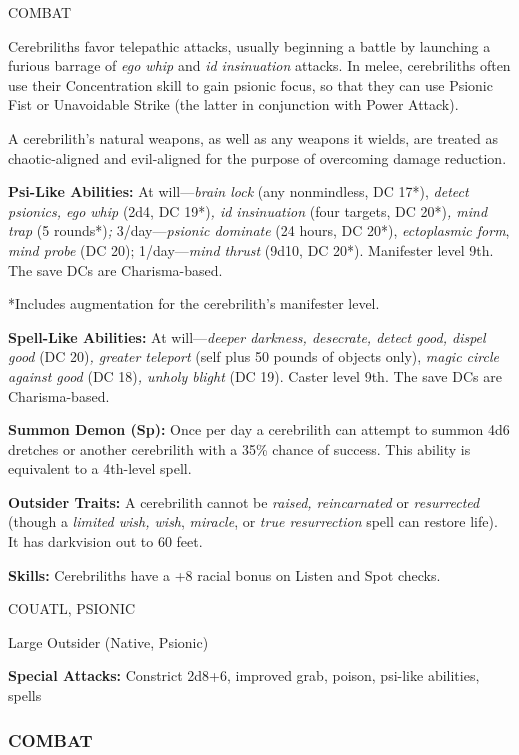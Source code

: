 \documentclass{article}
\begin{document}
COMBAT

Cerebriliths favor telepathic attacks, usually beginning a battle by launching 
a furious barrage of \textit{ego whip }and \textit{id insinuation }attacks. In 
melee, cerebriliths often use their Concentration skill to gain psionic focus, 
so that they can use Psionic Fist or Unavoidable Strike (the latter in conjunction 
with Power Attack).

A cerebrilith's natural weapons, as well as any weapons it wields, are treated 
as chaotic-aligned and evil-aligned for the purpose of overcoming damage reduction.

\textbf{Psi-Like Abilities:} At will---\textit{brain lock }(any nonmindless, DC 
17*), \textit{detect psionics, ego whip }(2d4, DC 19*)\textit{, id insinuation 
}(four targets, DC 20*)\textit{, mind trap }(5 rounds*)\textit{; }3/day---\textit{psionic 
dominate }(24 hours, DC 20*), \textit{ectoplasmic form}, \textit{mind probe }(DC 
20); 1/day---\textit{mind thrust }(9d10, DC 20*). Manifester level 9th. The save 
DCs are Charisma-based.

*Includes augmentation for the cerebrilith's manifester level.

\textbf{Spell-Like Abilities:} At will---\textit{deeper darkness, desecrate, detect 
good, dispel good }(DC 20)\textit{, greater teleport }(self plus 50 pounds of objects 
only), \textit{magic circle against good }(DC 18)\textit{, unholy blight }(DC 19). 
Caster level 9th. The save DCs are Charisma-based.

\textbf{Summon Demon (Sp):} Once per day a cerebrilith can attempt to summon 4d6 
dretches or another cerebrilith with a 35\% chance of success. This ability is 
equivalent to a 4th-level spell.

\textbf{Outsider Traits: }A cerebrilith cannot be \textit{raised, reincarnated 
}or \textit{resurrected }(though a \textit{limited wish, wish}, \textit{miracle}, 
or \textit{true resurrection }spell can restore life). It has darkvision out to 
60 feet. 

\textbf{Skills:} Cerebriliths have a +8 racial bonus on Listen and Spot checks.

\vspace{12pt}
{\LARGE{}COUATL, PSIONIC}

Large Outsider (Native, Psionic) 

\textbf{Special Attacks:} Constrict 2d8+6, improved grab, poison, psi-like abilities, 
spells

\subsubsection*{COMBAT}
\end{document}
